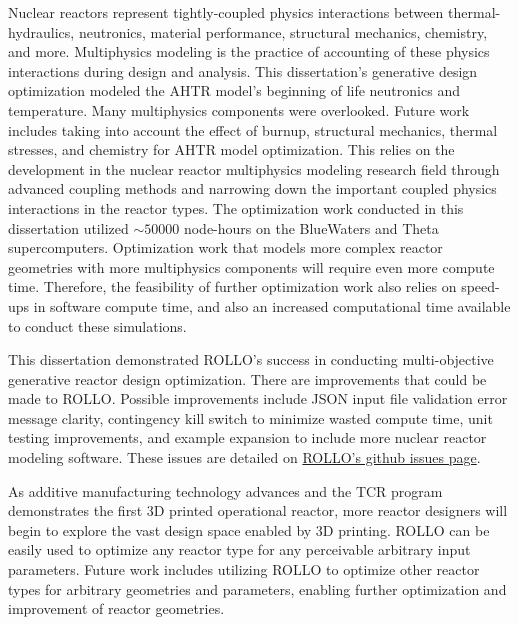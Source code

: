 Nuclear reactors represent tightly-coupled physics interactions between 
thermal-hydraulics, neutronics, material performance, structural mechanics, chemistry, 
and more. 
Multiphysics modeling is the practice of accounting of these physics interactions 
during design and analysis. 
This dissertation's generative design optimization modeled the \gls{AHTR} model's 
beginning of life neutronics and temperature. 
Many multiphysics components were overlooked. 
Future work includes taking into account the effect of burnup, structural mechanics, 
thermal stresses, and chemistry for \gls{AHTR} model optimization. 
This relies on the development in the nuclear reactor multiphysics modeling research 
field through advanced coupling methods and narrowing down the important coupled 
physics interactions in the reactor types. 
The optimization work conducted in this dissertation utilized $\sim 50000$ node-hours 
on the BlueWaters and Theta supercomputers. 
Optimization work that models more complex reactor geometries with more 
multiphysics components will require even more compute time. 
Therefore, the feasibility of further optimization work also relies on speed-ups 
in software compute time, and also an increased computational time available to 
conduct these simulations. 

This dissertation demonstrated \gls{ROLLO}'s success in conducting multi-objective 
generative reactor design optimization. 
There are improvements that could be made to \gls{ROLLO}. 
Possible improvements include JSON input file validation error message clarity, 
contingency kill switch to minimize wasted compute time, unit testing improvements, 
and example expansion to include more nuclear reactor modeling software.  
These issues are detailed on 
\hyperlink{https://github.com/arfc/rollo/issue}{ROLLO's github issues page}. 

As additive manufacturing technology advances and the \gls{TCR} program 
demonstrates the first 3D printed operational reactor, more reactor designers 
will begin to explore the vast design space enabled by 3D printing. 
\gls{ROLLO} can be easily used to optimize any reactor type for any perceivable 
arbitrary input parameters. 
Future work includes utilizing \gls{ROLLO} to optimize other reactor types for arbitrary
geometries and parameters, enabling further optimization and improvement of reactor 
geometries.


